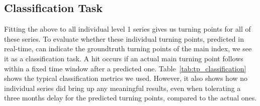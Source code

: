 \subsection{Classification Task}
Fitting the above to all individual level 1 series gives us turning points for all of these series. To evaluate whether these individual turning points, predicted in real-time, can indicate the groundtruth turning points of the main index, we see it as a classification task. A hit occurs if an actual main turning point follows within a fixed time window after a predicted one. Table~\ref{tab:tp_classification} shows the typical classification metrics we used. However, it also shows how no individual series did bring up any meaningful results, even when tolerating a three months delay for the predicted turning points, compared to the actual ones. 
\begin{table}[H]
\footnotesize
\centering
\begin{subtable}{\linewidth}
    \centering
    \caption{0 - 6 Months Lead time}
    \label{tab:tp_classification}
\end{subtable}

\vspace{0.5em}
\begin{subtable}{\linewidth}
    \centering
    \caption{-3 - 6 Months Lead time}
\end{subtable}
\end{table}
